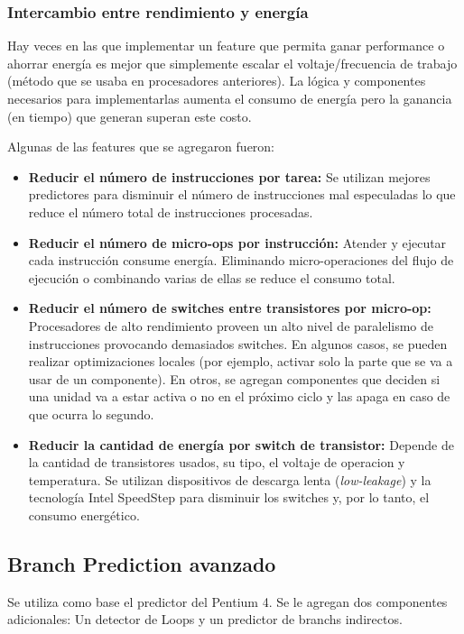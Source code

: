 \subsubsection{Intercambio entre rendimiento y energía}
 Hay veces en las que implementar un feature que permita ganar performance o ahorrar energía es mejor que simplemente escalar el voltaje/frecuencia de trabajo (método que se usaba en procesadores anteriores). La lógica y componentes necesarios para implementarlas aumenta el consumo de energía pero la ganancia (en tiempo) que generan superan este costo.

Algunas de las features que se agregaron fueron:
\begin{itemize}
	\item\textbf{Reducir el número de instrucciones por tarea:} Se utilizan mejores predictores para disminuir el número de instrucciones mal especuladas lo que reduce el número total de instrucciones procesadas.
	
	\item\textbf{Reducir el número de micro-ops por instrucción:} Atender y ejecutar cada instrucción consume energía. Eliminando micro-operaciones del flujo de ejecución o combinando varias de ellas se reduce el consumo total.
	
	\item\textbf{Reducir el número de switches entre transistores por micro-op:} Procesadores de alto rendimiento  proveen un alto nivel de paralelismo de instrucciones provocando demasiados switches. En algunos casos, se pueden realizar optimizaciones locales (por ejemplo, activar solo la parte que se va a usar de un componente). En otros, se agregan componentes que deciden si una unidad va a estar activa o no en el próximo ciclo y las apaga en caso de que ocurra lo segundo.
	
	\item\textbf{Reducir la cantidad de energía por switch de transistor:} Depende de la cantidad de transistores usados, su tipo, el voltaje de operacion y temperatura. Se utilizan dispositivos de descarga lenta (\textit{low-leakage}) y la tecnología Intel SpeedStep para disminuir los switches y, por lo tanto, el consumo energético. 
\end{itemize}

\subsection{Branch Prediction avanzado}

Se utiliza como base el predictor del Pentium 4. Se le agregan dos componentes adicionales: Un detector de Loops y un predictor de branchs indirectos.

